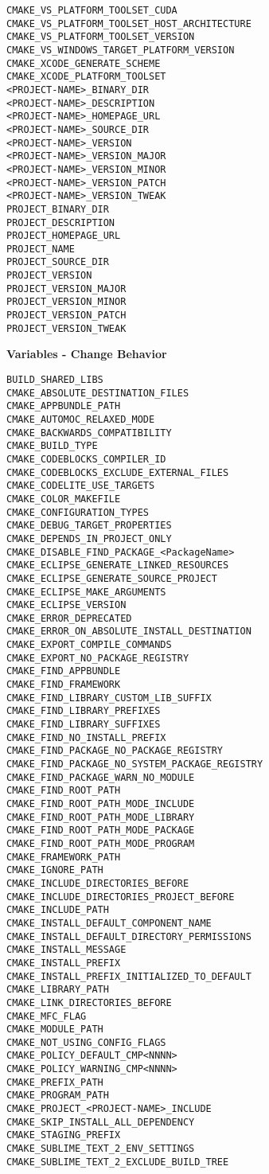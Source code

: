 \documentclass{article}
\begin{document}
\begin{minipage}[t]{0.18\linewidth}
\begin{verbatim}
CMAKE_VS_PLATFORM_TOOLSET_CUDA
CMAKE_VS_PLATFORM_TOOLSET_HOST_ARCHITECTURE
CMAKE_VS_PLATFORM_TOOLSET_VERSION
CMAKE_VS_WINDOWS_TARGET_PLATFORM_VERSION
CMAKE_XCODE_GENERATE_SCHEME
CMAKE_XCODE_PLATFORM_TOOLSET
<PROJECT-NAME>_BINARY_DIR
<PROJECT-NAME>_DESCRIPTION
<PROJECT-NAME>_HOMEPAGE_URL
<PROJECT-NAME>_SOURCE_DIR
<PROJECT-NAME>_VERSION
<PROJECT-NAME>_VERSION_MAJOR
<PROJECT-NAME>_VERSION_MINOR
<PROJECT-NAME>_VERSION_PATCH
<PROJECT-NAME>_VERSION_TWEAK
PROJECT_BINARY_DIR
PROJECT_DESCRIPTION
PROJECT_HOMEPAGE_URL
PROJECT_NAME
PROJECT_SOURCE_DIR
PROJECT_VERSION
PROJECT_VERSION_MAJOR
PROJECT_VERSION_MINOR
PROJECT_VERSION_PATCH
PROJECT_VERSION_TWEAK
\end{verbatim}

\textbf{Variables - Change Behavior}
\begin{verbatim}
BUILD_SHARED_LIBS
CMAKE_ABSOLUTE_DESTINATION_FILES
CMAKE_APPBUNDLE_PATH
CMAKE_AUTOMOC_RELAXED_MODE
CMAKE_BACKWARDS_COMPATIBILITY
CMAKE_BUILD_TYPE
CMAKE_CODEBLOCKS_COMPILER_ID
CMAKE_CODEBLOCKS_EXCLUDE_EXTERNAL_FILES
CMAKE_CODELITE_USE_TARGETS
CMAKE_COLOR_MAKEFILE
CMAKE_CONFIGURATION_TYPES
CMAKE_DEBUG_TARGET_PROPERTIES
CMAKE_DEPENDS_IN_PROJECT_ONLY
CMAKE_DISABLE_FIND_PACKAGE_<PackageName>
CMAKE_ECLIPSE_GENERATE_LINKED_RESOURCES
CMAKE_ECLIPSE_GENERATE_SOURCE_PROJECT
CMAKE_ECLIPSE_MAKE_ARGUMENTS
CMAKE_ECLIPSE_VERSION
CMAKE_ERROR_DEPRECATED
CMAKE_ERROR_ON_ABSOLUTE_INSTALL_DESTINATION
CMAKE_EXPORT_COMPILE_COMMANDS
CMAKE_EXPORT_NO_PACKAGE_REGISTRY
CMAKE_FIND_APPBUNDLE
CMAKE_FIND_FRAMEWORK
CMAKE_FIND_LIBRARY_CUSTOM_LIB_SUFFIX
CMAKE_FIND_LIBRARY_PREFIXES
CMAKE_FIND_LIBRARY_SUFFIXES
CMAKE_FIND_NO_INSTALL_PREFIX
CMAKE_FIND_PACKAGE_NO_PACKAGE_REGISTRY
CMAKE_FIND_PACKAGE_NO_SYSTEM_PACKAGE_REGISTRY
CMAKE_FIND_PACKAGE_WARN_NO_MODULE
CMAKE_FIND_ROOT_PATH
CMAKE_FIND_ROOT_PATH_MODE_INCLUDE
CMAKE_FIND_ROOT_PATH_MODE_LIBRARY
CMAKE_FIND_ROOT_PATH_MODE_PACKAGE
CMAKE_FIND_ROOT_PATH_MODE_PROGRAM
CMAKE_FRAMEWORK_PATH
CMAKE_IGNORE_PATH
CMAKE_INCLUDE_DIRECTORIES_BEFORE
CMAKE_INCLUDE_DIRECTORIES_PROJECT_BEFORE
CMAKE_INCLUDE_PATH
CMAKE_INSTALL_DEFAULT_COMPONENT_NAME
CMAKE_INSTALL_DEFAULT_DIRECTORY_PERMISSIONS
CMAKE_INSTALL_MESSAGE
CMAKE_INSTALL_PREFIX
CMAKE_INSTALL_PREFIX_INITIALIZED_TO_DEFAULT
CMAKE_LIBRARY_PATH
CMAKE_LINK_DIRECTORIES_BEFORE
CMAKE_MFC_FLAG
CMAKE_MODULE_PATH
CMAKE_NOT_USING_CONFIG_FLAGS
CMAKE_POLICY_DEFAULT_CMP<NNNN>
CMAKE_POLICY_WARNING_CMP<NNNN>
CMAKE_PREFIX_PATH
CMAKE_PROGRAM_PATH
CMAKE_PROJECT_<PROJECT-NAME>_INCLUDE
CMAKE_SKIP_INSTALL_ALL_DEPENDENCY
CMAKE_STAGING_PREFIX
CMAKE_SUBLIME_TEXT_2_ENV_SETTINGS
CMAKE_SUBLIME_TEXT_2_EXCLUDE_BUILD_TREE
\end{verbatim}
\end{minipage}
\end{document}
